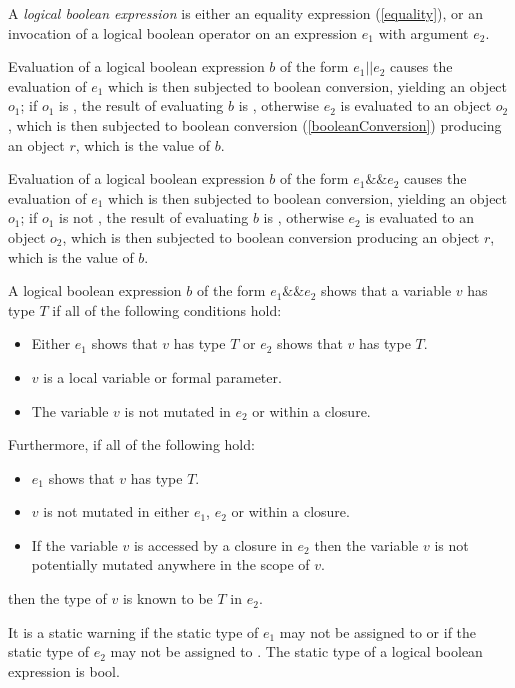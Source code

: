 \documentclass{article}
\newcommand{\code}[1]{{\sf #1}}
\begin{document}
\LMHash{}
A {\em logical boolean expression} is either an equality expression (\ref{equality}), or an invocation of a logical boolean operator on an expression $e_1$ with argument $e_2$.
 
\LMHash{}
Evaluation of a logical boolean expression $b$ of the form $e_1 || e_2$ causes the evaluation of $e_1$ which is then  subjected to boolean conversion, yielding an object $o_1$; if $o_1$ is \TRUE, the result of evaluating $b$ is \TRUE, otherwise $e_2$ is evaluated to an object $o_2$, which is then subjected to boolean conversion (\ref{booleanConversion}) producing an object $r$, which is the value of $b$. 

\LMHash{}
Evaluation of a logical boolean expression $b$ of the form $e_1 \&\& e_2$ causes the evaluation of $e_1$ which is then subjected to boolean conversion, yielding an object $o_1$; if $o_1$ is not  \TRUE, the result of evaluating $b$ is \FALSE, otherwise $e_2$ is evaluated to an object $o_2$, which is then subjected to boolean conversion producing an object $r$, which is the value of $b$. 

\LMHash{}
A logical boolean expression $b$ of the form $e_1 \&\& e_2$ shows that a variable $v$ has type 
$T$ if all of the following conditions hold:
\begin{itemize}
\item Either $e_1$ shows that $v$ has type $T$ or $e_2$ shows that $v$ has type $T$.
\item $v$ is a local variable or formal parameter.
\item The variable $v$ is not mutated in $e_2$ or within a closure.
\end{itemize}

\LMHash{}
Furthermore, if all of the following hold:
\begin{itemize}
\item $e_1$ shows that $v$ has type $T$.
\item $v$ is not mutated in either $e_1$, $e_2$ or within a closure.
\item If the variable $v$ is accessed by a closure in $e_2$ then the variable $v$ is not potentially mutated anywhere in the scope of $v$. 
\end{itemize}
then the type of $v$ is known to be $T$ in $e_2$.

\LMHash{}
It is a static warning if the static type of $e_1$ may not be assigned to  or if the static type of $e_2$ may not be assigned to . The static type of a logical boolean expression is \code{bool}.
\end{document}
